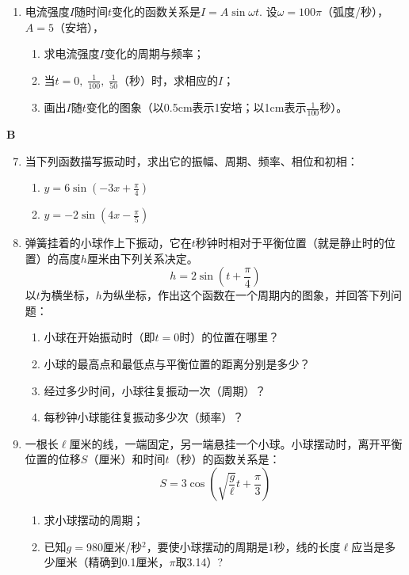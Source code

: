 \begin{enumerate}
\item 电流强度$I$随时间$t$变化的函数关系是$I=A\sin\omega t$. 设$\omega=100\pi$（弧度/秒），$A=5$（安培），
\begin{enumerate}[(1)]
\item 求电流强度$I$变化的周期与频率；
\item 当$t=0,\; \frac{1}{100},\; \frac{1}{50}$（秒）时，求相应的$I$；
\item 画出$I$随$t$变化的图象（以0.5cm表示1安培；以1cm表示$\frac{1}{100}$秒）。
\end{enumerate}
\end{enumerate}

\begin{center}
    \bfseries B
\end{center}
\begin{enumerate}\setcounter{enumi}{6}
    \item 当下列函数描写振动时，求出它的振幅、周期、频率、相位和初相：
\begin{multicols}{2}
\begin{enumerate}[(1)]
    \item $y=6\sin\left(-3x+\frac{\pi}{4}\right)$
    \item $y=-2\sin\left(4x-\frac{\pi}{5}\right)$
\end{enumerate}
\end{multicols}

\item 弹簧挂着的小球作上下振动，它在$t$秒钟时相对于平衡位置（就是静止时的位置）的高度$h$厘米由下列关系决定。
\[h=2\sin\left(t+\frac{\pi}{4}\right)\]
以$t$为横坐标，$h$为纵坐标，作出这个函数在一个周期内的图象，并回答下列问题：
\begin{enumerate}[(1)]
\item 小球在开始振动时（即$t=0$时）的位置在哪里？
\item 小球的最高点和最低点与平衡位置的距离分别是多少？
\item 经过多少时间，小球往复振动一次（周期）？
\item 每秒钟小球能往复振动多少次（频率）？   
\end{enumerate}

\item 一根长$\ell$厘米的线，一端固定，另一端悬挂一个小球。小球摆动时，离开平衡位置的位移$S$（厘米）和时间$t$（秒）的函数关系是：
\[S=3\cos\left(\sqrt{\frac{g}{\ell}}t+\frac{\pi}{3}\right)\]
\begin{enumerate}[(1)]
\item 求小球摆动的周期；
\item 已知$g=$980厘米/秒$^2$，要使小球摆动的周期是1秒，线的长度$\ell$应当是多少厘米（精确到0.1厘米，$\pi$取3.14）?
\end{enumerate}
\end{enumerate}

